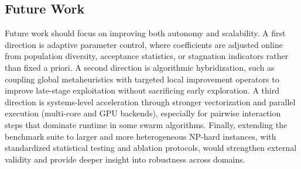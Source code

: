 \subsection{Future Work}
\label{subsec:future_work}
Future work should focus on improving both autonomy and scalability. A first direction is adaptive parameter control, where coefficients are adjusted online from population diversity, acceptance statistics, or stagnation indicators rather than fixed a priori. A second direction is algorithmic hybridization, such as coupling global metaheuristics with targeted local improvement operators to improve late-stage exploitation without sacrificing early exploration. A third direction is systems-level acceleration through stronger vectorization and parallel execution (multi-core and GPU backends), especially for pairwise interaction steps that dominate runtime in some swarm algorithms. Finally, extending the benchmark suite to larger and more heterogeneous NP-hard instances, with standardized statistical testing and ablation protocols, would strengthen external validity and provide deeper insight into robustness across domains.